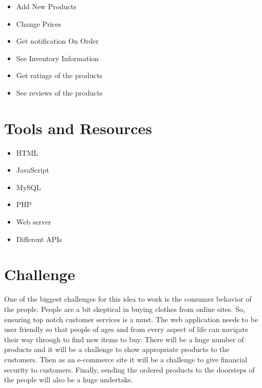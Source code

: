 \documentclass{article}
\begin{document}
\begin{itemize}
\item Add New Products 
\item Change Prices
\item Get notification On Order 
\item See Inventory Information
\item Get ratings of the products
\item See reviews of the products
\end{itemize}


\pagebreak 

\section{Tools and Resources}
\begin{itemize}
\item HTML
\item JavaScript
\item MySQL
\item PHP
\item Web server
\item  Different APIs
\end{itemize}


\section{Challenge}
One of the biggest challenges for this idea to work is the consumer behavior of the people. People are a bit skeptical in buying clothes from online sites. So, ensuring top notch customer services is a must. The web application needs to be user friendly so that people of ages and from every aspect of life can navigate their way through to find new items to buy. There will be a huge number of products and it will be a challenge to show appropriate products to the customers. Then as an e-commerce site it will be a challenge to give financial security to customers. Finally, sending the ordered products to the doorsteps of the people will also be a huge undertake.
\end{document}

